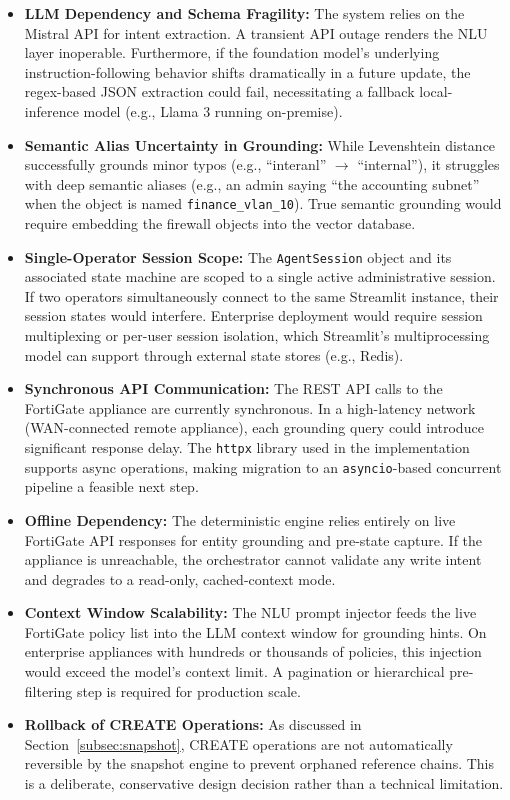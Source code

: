 \begin{itemize}
    \item \textbf{LLM Dependency and Schema Fragility:} The system relies on the Mistral API for intent extraction. A transient API outage renders the NLU layer inoperable. Furthermore, if the foundation model's underlying instruction-following behavior shifts dramatically in a future update, the regex-based JSON extraction could fail, necessitating a fallback local-inference model (e.g., Llama 3 running on-premise).
    \item \textbf{Semantic Alias Uncertainty in Grounding:} While Levenshtein distance successfully grounds minor typos (e.g., ``interanl'' $\to$ ``internal''), it struggles with deep semantic aliases (e.g., an admin saying ``the accounting subnet'' when the object is named \texttt{finance\_vlan\_10}). True semantic grounding would require embedding the firewall objects into the vector database.
    \item \textbf{Single-Operator Session Scope:} The \texttt{AgentSession} object and its associated state machine are scoped to a single active administrative session. If two operators simultaneously connect to the same Streamlit instance, their session states would interfere. Enterprise deployment would require session multiplexing or per-user session isolation, which Streamlit's multiprocessing model can support through external state stores (e.g., Redis).
    \item \textbf{Synchronous API Communication:} The REST API calls to the FortiGate appliance are currently synchronous. In a high-latency network (WAN-connected remote appliance), each grounding query could introduce significant response delay. The \texttt{httpx} library used in the implementation supports async operations, making migration to an \texttt{asyncio}-based concurrent pipeline a feasible next step.
    \item \textbf{Offline Dependency:} The deterministic engine relies entirely on live FortiGate API responses for entity grounding and pre-state capture. If the appliance is unreachable, the orchestrator cannot validate any write intent and degrades to a read-only, cached-context mode.
    \item \textbf{Context Window Scalability:} The NLU prompt injector feeds the live FortiGate policy list into the LLM context window for grounding hints. On enterprise appliances with hundreds or thousands of policies, this injection would exceed the model's context limit. A pagination or hierarchical pre-filtering step is required for production scale.
    \item \textbf{Rollback of CREATE Operations:} As discussed in Section~\ref{subsec:snapshot}, CREATE operations are not automatically reversible by the snapshot engine to prevent orphaned reference chains. This is a deliberate, conservative design decision rather than a technical limitation.
\end{itemize}

